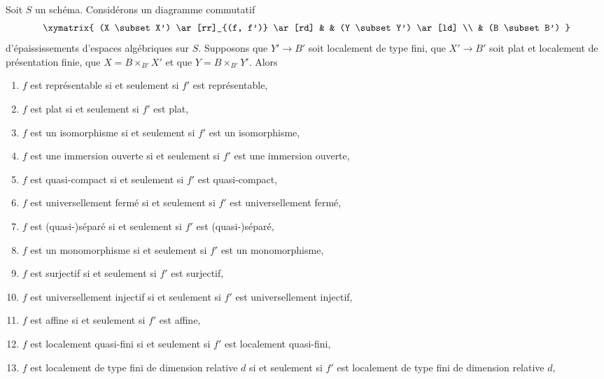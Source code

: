 \begin{lemma}
\label{lemma-deform-property-fp-over-ft}
Soit $S$ un schéma. Considérons un diagramme commutatif
$$
\xymatrix{
(X \subset X') \ar[rr]_{(f, f')} \ar[rd] & & (Y \subset Y') \ar[ld] \\
& (B \subset B')
}
$$
d'épaississements d'espaces algébriques sur $S$.
Supposons que $Y' \to B'$ soit localement de type fini,
que $X' \to B'$ soit plat et localement de présentation finie,
que $X = B \times_{B'} X'$ et que $Y = B \times_{B'} Y'$. Alors
\begin{enumerate}
\item $f$ est représentable si et seulement si $f'$ est représentable,
\label{item-representable-fp-over-ft}
\item $f$ est plat si et seulement si $f'$ est plat,
\label{item-flat-fp-over-ft}
\item $f$ est un isomorphisme si et seulement si $f'$ est un isomorphisme,
\label{item-isomorphism-fp-over-ft}
\item $f$ est une immersion ouverte si et seulement si $f'$ est une immersion ouverte,
\label{item-open-immersion-fp-over-ft}
\item $f$ est quasi-compact si et seulement si $f'$ est quasi-compact,
\label{item-quasi-compact-fp-over-ft}
\item $f$ est universellement fermé si et seulement si $f'$ est universellement fermé,
\label{item-universally-closed-fp-over-ft}
\item $f$ est (quasi-)séparé si et seulement si $f'$ est (quasi-)séparé,
\label{item-separated-fp-over-ft}
\item $f$ est un monomorphisme si et seulement si $f'$ est un monomorphisme,
\label{item-monomorphism-fp-over-ft}
\item $f$ est surjectif si et seulement si $f'$ est surjectif,
\label{item-surjective-fp-over-ft}
\item $f$ est universellement injectif si et seulement si $f'$ est universellement injectif,
\label{item-universally-injective-fp-over-ft}
\item $f$ est affine si et seulement si $f'$ est affine,
\label{item-affine-fp-over-ft}
\item $f$ est localement quasi-fini si et seulement si $f'$ est localement quasi-fini,
\label{item-quasi-finite-fp-over-ft}
\item
\label{item-relative-dimension-d-fp-over-ft}
$f$ est localement de type fini de dimension relative $d$ si et seulement si
$f'$ est localement de type fini de dimension relative $d$,

\end{enumerate}
\end{lemma}
